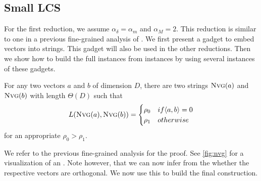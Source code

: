 \subsection{Small LCS}
For the first reduction, we assume $\alpha_\delta = \alpha_m$ and $\alpha_M = 2$. %
This reduction is similar to one in a previous fine-grained analysis of \lcs{} \cite{Bringmann.2015}.
We first present a gadget to embed vectors into strings.
This gadget will also be used in the other reductions.
Then we show how to build the full \lcs{} instances from \ov{} instances by using several instances of these gadgets.



\begin{theorem}
\label{thm:nvg}
For any two vectors $a$ and $b$ of dimension $D$, there are two strings $\text{\textsc{Nvg}}(a)$ and $\text{\textsc{Nvg}}(b)$ with length $\Theta(D)$ such that
\[
L(\text{\textsc{Nvg}}(a), \text{\textsc{Nvg}}(b)) = \begin{cases}
		\rho_0 & if \langle a, b \rangle = 0\\
		\rho_1 & otherwise
	\end{cases}
\]
for an appropriate $\rho_0 > \rho_1$.
\end{theorem}



We refer to the previous fine-grained analysis \cite{Bringmann.2015} for the proof.
See \autoref{fig:nvg} for a visualization of an \nvgName{}.
Note however, that we can now infer from the \lcs{} whether the respective vectors are orthogonal.
We now use this to build the final construction.


